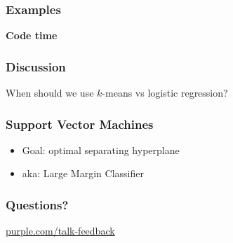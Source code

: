 \begin{frame}
  \frametitle{Examples}

  \vfill
  \centerline{\huge{\bf Code time}}
\end{frame}

\begin{frame}
  \frametitle{Discussion}

  When should we use $k$-means vs logistic regression?
  
\end{frame}


\begin{frame}
  \frametitle{Support Vector Machines}

   {
    \begin{itemize}
    \item Goal: optimal separating hyperplane
    \item aka: Large Margin Classifier
    \end{itemize}
  }

\end{frame}



\begin{frame}
  \frametitle{Questions?}
  \vspace{3cm}
  \centerline{\large\url{purple.com/talk-feedback}}
\end{frame}


